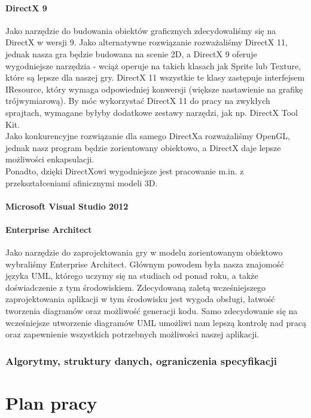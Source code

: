 \documentclass[a4paper,twoside]{article}
\begin{document}
		\subsection{DirectX 9}
			Jako narzędzie do budowania obiektów graficznych zdecydowaliśmy się na DirectX w wersji 9. Jako alternatywne rozwiązanie rozważaliśmy DirectX 11, jednak nasza gra będzie budowana na scenie 2D, a DirectX 9 oferuje wygodniejsze narzędzia - wciąż operuje na takich klasach jak Sprite lub Texture, które są lepsze dla naszej gry. DirectX 11 wszystkie te klasy zastępuje interfejsem IResource, który wymaga odpowiedniej konwersji (większe nastawienie na grafikę trójwymiarową). By móc wykorzystać DirectX 11 do pracy na zwykłych sprajtach, wymagane byłyby dodatkowe zestawy narzędzi, jak np. DirectX Tool Kit.\\
			Jako konkurencyjne rozwiązanie dla samego DirectXa rozważaliśmy OpenGL, jednak nasz program będzie zorientowany obiektowo, a DirectX daje lepsze możliwości enkapsulacji.\\
			Ponadto, dzięki DirectXowi wygodniejsze jest pracowanie m.in. z przekształceniami afinicznymi modeli 3D.
		\subsection{Microsoft Visual Studio 2012}
			
		\subsection{Enterprise Architect}
			Jako narzędzie do zaprojektowania gry w modelu zorientowanym obiektowo wybraliśmy Enterprise Architect. Głównym powodem była nasza znajomość języka UML, którego uczymy się na studiach od ponad roku, a także doświadczenie z tym środowiskiem. Zdecydowaną zaletą wcześniejszego zaprojektowania aplikacji w tym środowisku jest wygoda obsługi, łatwość tworzenia diagramów oraz możliwość generacji kodu. Samo zdecydowanie się na wcześniejsze utworzenie diagramów UML umożliwi nam lepszą kontrolę nad pracą oraz zapewnienie wszystkich potrzebnych możliwości naszej aplikacji.
	
	
	\section{Algorytmy, struktury danych, ograniczenia specyfikacji}
	
	\newpage
	
	\part{Plan pracy}
\end{document}

